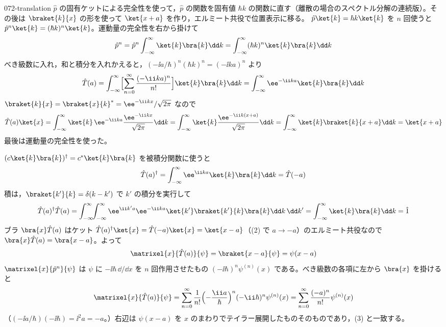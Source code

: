 \documentclass[uplatex,dvipdfmx,a4paper,11pt]{jsarticle}
\begin{document}
\kaitouhen
{}
\begin{kaisetsu}{072-translation}
\houshin $\hat{p}$ の固有ケットによる完全性を使って，$\hat{p}$ の関数を固有値 $\hbar k$ の関数に直す（離散の場合のスペクトル分解の連続版）。その後は $\braket{k}{x}$ の形を使って $\ket{x+a}$ を作り，エルミート共役で位置表示に移る。
\keisan {} $\hat{p}\ket{k}=\hbar k\ket{k}$ を $n$ 回使うと $\hat{p}^{n}\ket{k}=(\hbar k)^{n}\ket{k}$。運動量の完全性を右から掛けて
\[ \hat{p}^{n}=\hat{p}^{n}\int_{-\infty}^{\infty}\ket{k}\bra{k}\dd k=\int_{-\infty}^{\infty}(\hbar k)^{n}\ket{k}\bra{k}\dd k \]
べき級数に入れ，和と積分を入れかえると，$(-\ii a/\hbar)^{n}(\hbar k)^{n}=(-\ii ka)^{n}$ より
\[ \hat{T}(a)=\int_{-\infty}^{\infty}\Bigl[\sum_{n=0}^{\infty}\frac{(-\ii ka)^{n}}{n!}\Bigr]\ket{k}\bra{k}\dd k=\int_{-\infty}^{\infty}\ee^{-\ii ka}\ket{k}\bra{k}\dd k \]
 $\braket{k}{x}=\braket{x}{k}^{*}=\ee^{-\ii kx}/\sqrt{2\pi}$ なので
\[ \hat{T}(a)\ket{x}=\int_{-\infty}^{\infty}\ket{k}\,\ee^{-\ii ka}\frac{\ee^{-\ii kx}}{\sqrt{2\pi}}\dd k=\int_{-\infty}^{\infty}\ket{k}\frac{\ee^{-\ii k(x+a)}}{\sqrt{2\pi}}\dd k=\int_{-\infty}^{\infty}\ket{k}\braket{k}{x+a}\dd k=\ket{x+a} \]
最後は運動量の完全性を使った。

 $(c\ket{k}\bra{k})^{\dagger}=c^{*}\ket{k}\bra{k}$ を被積分関数に使うと
\[ \hat{T}(a)^{\dagger}=\int_{-\infty}^{\infty}\ee^{\ii ka}\ket{k}\bra{k}\dd k=\hat{T}(-a) \]
積は，$\braket{k'}{k}=\delta(k-k')$ で $k'$ の積分を実行して
\[ \hat{T}(a)^{\dagger}\hat{T}(a)=\int_{-\infty}^{\infty}\!\!\int_{-\infty}^{\infty}\ee^{\ii k'a}\ee^{-\ii ka}\ket{k'}\braket{k'}{k}\bra{k}\dd k\,\dd k'=\int_{-\infty}^{\infty}\ket{k}\bra{k}\dd k=\hat{1} \]
ブラ $\bra{x}\hat{T}(a)$ はケット $\hat{T}(a)^{\dagger}\ket{x}=\hat{T}(-a)\ket{x}=\ket{x-a}$（(2) で $a\to-a$）のエルミート共役なので $\bra{x}\hat{T}(a)=\bra{x-a}$。よって
\[ \matrixel{x}{\hat{T}(a)}{\psi}=\braket{x-a}{\psi}=\psi(x-a) \]
 $\matrixel{x}{\hat{p}^{n}}{\psi}$ は $\psi$ に $-\ii\hbar\,\dd/\dd x$ を $n$ 回作用させたもの $(-\ii\hbar)^{n}\psi^{(n)}(x)$ である。べき級数の各項に左から $\bra{x}$ を掛けると
\[ \matrixel{x}{\hat{T}(a)}{\psi}=\sum_{n=0}^{\infty}\frac{1}{n!}\Bigl(-\frac{\ii a}{\hbar}\Bigr)^{n}(-\ii\hbar)^{n}\psi^{(n)}(x)=\sum_{n=0}^{\infty}\frac{(-a)^{n}}{n!}\psi^{(n)}(x) \]
（$(-\ii a/\hbar)(-\ii\hbar)=\ii^{2}a=-a$。）右辺は $\psi(x-a)$ を $x$ のまわりでテイラー展開したものそのものであり，(3) と一致する。


\end{kaisetsu}
\end{document}
